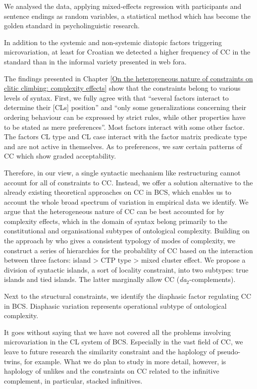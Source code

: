 We analysed the data, applying mixed-effects regression with participants and sentence endings as random variables, a statistical method which has become the golden standard in psycholinguistic research.

In addition to the systemic and non-systemic diatopic factors triggering microvariation, at least for Croatian we detected a higher frequency of CC in the standard than in the informal variety presented in web fora. 

The findings presented in Chapter \ref{On the heterogeneous nature of constraints on clitic climbing: complexity effects} show that the constraints belong to various levels of syntax.  First, we fully agree with  \citet[205]{Rosen01} that ``several factors interact to determine their [CLs] position'' and ``only some generalizations concerning their ordering behaviour can be expressed by strict rules, while other properties have to be stated as mere preferences''. Most factors interact with some other factor. The factors CL type and CL case interact with the factor matrix predicate type and are not active in themselves. As to preferences, we saw certain patterns of CC which show graded acceptability. 

Therefore, in our view, a single syntactic mechanism like restructuring cannot account for all of constraints to CC. Instead, we offer a solution alternative to the already existing theoretical approaches on CC in BCS, which enables us to account the whole broad spectrum of variation in empirical data we identify. We argue that the heterogeneous nature of CC can be best accounted for by complexity effects, which in the domain of syntax belong primarily to the constitutional and organisational subtypes of ontological complexity. Building on the approach by \citet{Rescher98} who gives a consistent typology of modes of complexity, we construct a series of hierarchies for the probability of CC based on the interaction between three factors: island {\textgreater} CTP type {\textgreater} mixed cluster effect. We propose a division of syntactic islands, a sort of locality constraint, into two subtypes: true islands and tied islands. The latter marginally allow CC (\textit{da}$_2$-complements). 

Next to the structural constraints, we identify the diaphasic factor regulating CC in BCS. Diaphasic variation represents operational subtype of ontological complexity.


It goes without saying that we have not covered all the problems involving microvariation in the CL system of BCS. Especially in the vast field of CC, we leave to future research the similarity constraint and the haplology of pseudo-twins, for example. What we do plan to study in more detail, however, is haplology of unlikes and the constraints on CC related to the infinitive complement, in particular, stacked infinitives.  
